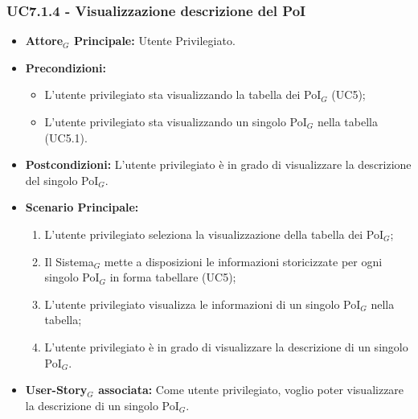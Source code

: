 \documentclass[10pt]{article}
\begin{document}
\begin{justify}
\subsubsection{\textbf{UC7.1.4 - Visualizzazione descrizione del PoI}}
\label{UC7.1.4}
\begin{itemize}
    \item \textbf{Attore$_G$ Principale:} Utente Privilegiato.
    \item \textbf{Precondizioni:} 
        \begin{itemize}
          \item L'utente privilegiato sta visualizzando la tabella dei PoI$_G$ (UC5);
            \item L'utente privilegiato sta visualizzando un singolo PoI$_G$ nella tabella (UC5.1).
        \end{itemize}
      \item \textbf{Postcondizioni:} L'utente privilegiato è in grado di visualizzare la descrizione del singolo PoI$_G$.
    \item \textbf{Scenario Principale:} 
        \begin{enumerate}
        \item L'utente privilegiato seleziona la visualizzazione della tabella dei PoI$_G$;
          \item Il Sistema$_G$ mette a disposizioni le informazioni storicizzate per ogni singolo PoI$_G$ in forma tabellare (UC5);
          \item L'utente privilegiato visualizza le informazioni di un singolo PoI$_G$ nella tabella;
            \item L'utente privilegiato è in grado di visualizzare la descrizione di un singolo PoI$_G$.
        \end{enumerate}
    \item \textbf{User-Story$_G$ associata:} Come utente privilegiato, voglio poter visualizzare la descrizione di un singolo PoI$_G$.
\end{itemize}

\end{justify}
\end{document}
